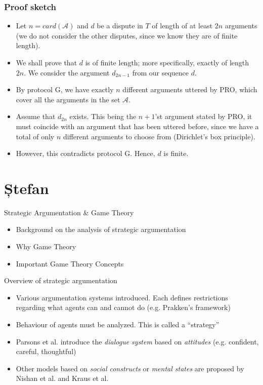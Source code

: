 \documentclass{beamer}
\begin{document}
\begin{frame}
	\frametitle{Proof sketch}
	\begin{itemize}
		\item Let $n = card(\mathcal{A})$ and $d$ be a dispute in $T$ of length of at least $2n$ arguments (we do not consider the other disputes, since we know they are of finite length).\pause
		\item We shall prove that $d$ is of finite length; more specifically, exactly of length $2n$. We consider the argument $d_{2n - 1}$ from our sequence $d$.\pause
		\item By protocol G, we have exactly $n$ different arguments uttered by PRO, which cover all the arguments in the set $\mathcal{A}$. \pause
		\item Assume that $d_{2n}$ exists. This being the $n+1$'st argument stated by PRO, it must coincide with an argument that has been uttered before, since we have a total of only $n$ different arguments to choose from (Dirichlet's box principle). \pause
		\item However, this contradicts protocol G. Hence, $d$ is finite.
	\end{itemize}
\end{frame}
\section{Ștefan}

\begin{frame}{Strategic Argumentation \& Game Theory}
\begin{itemize}
    \item Background on the analysis of strategic argumentation
    \item Why Game Theory
    \item Important Game Theory Concepts
\end{itemize}
\end{frame}

\begin{frame}{Overview of strategic argumentation}
\begin{itemize}
    \pause
    \item Various argumentation systems introduced. Each defines restrictions regarding what agents can and cannot do (e.g. Prakken's framework) \pause
    \item Behaviour of agents must be analyzed. This is called a ``strategy'' \pause
    \item Parsons et al. introduce the \emph{dialogue system} based on \emph{attitudes} (e.g. confident, careful, thoughtful) \pause
    \item Other models based on \emph{social constructs} or \emph{mental states} are proposed by Nishan et al. and Kraus et al.
\end{itemize}
\end{frame}
\end{document}

